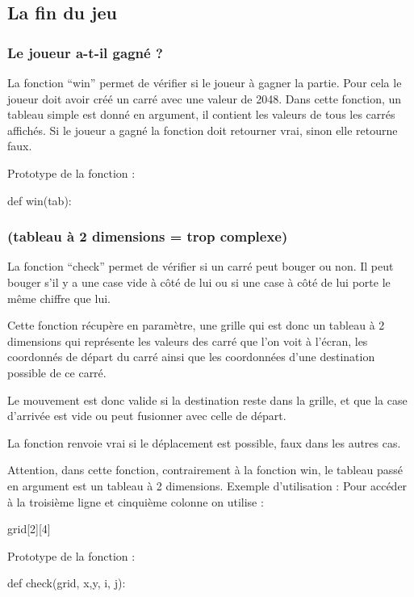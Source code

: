 \subsection{La fin du jeu}
\subsubsection{Le joueur a-t-il gagné ?}
La fonction “win” permet de vérifier si le joueur à gagner la partie. Pour cela le joueur doit avoir créé un carré avec une valeur de 2048.
Dans cette fonction, un tableau simple est donné en argument, il contient les valeurs de tous les carrés affichés.
Si le joueur a gagné la fonction doit retourner vrai, sinon elle retourne faux. 

Prototype de la fonction :
\begin{pythonCode}
def win(tab):
\end{pythonCode}




\subsubsection{(tableau à 2 dimensions = trop complexe)}
La fonction “check” permet de vérifier si un carré peut bouger ou non. Il peut bouger s'il y a une case vide à côté de lui ou si une case à côté de lui porte le même chiffre que lui. 


Cette fonction récupère en paramètre, une grille qui est donc un tableau à 2 dimensions qui représente les valeurs des carré que l'on voit à l'écran, les coordonnés de départ du  carré ainsi que les coordonnées d'une destination possible de ce carré.


Le mouvement est donc valide si la destination reste dans la grille, et que la case d'arrivée est vide ou peut fusionner avec celle de départ.




La fonction renvoie vrai si le déplacement est possible, faux dans les autres cas. 






Attention, dans cette fonction, contrairement à la fonction win, le tableau passé en argument est un tableau à 2 dimensions.
Exemple d'utilisation :
Pour accéder à la troisième ligne et cinquième colonne on utilise : 
\begin{pythonCode}
 grid[2][4] 
\end{pythonCode}


Prototype de la fonction :
\begin{pythonCode}
def check(grid, x,y, i, j):
\end{pythonCode}








